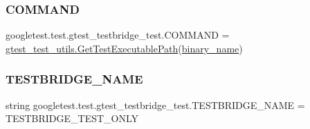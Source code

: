 \subsubsection{\texorpdfstring{COMMAND}{COMMAND}}
{\footnotesize\ttfamily googletest.\+test.\+gtest\+\_\+testbridge\+\_\+test.\+C\+O\+M\+M\+A\+ND = \mbox{\hyperlink{namespacegoogletest_1_1test_1_1gtest__test__utils_ac9af888c702350aac56b154a6af34098}{gtest\+\_\+test\+\_\+utils.\+Get\+Test\+Executable\+Path}}(\mbox{\hyperlink{namespacegoogletest_1_1test_1_1gtest__testbridge__test_a59ccdbf94eb879ba6516ba5b6c72719d}{binary\+\_\+name}})}

\mbox{\label{namespacegoogletest_1_1test_1_1gtest__testbridge__test_a891a204293b2ba9434a8486ac154754d}} 
\subsubsection{\texorpdfstring{TESTBRIDGE\_NAME}{TESTBRIDGE\_NAME}}
{\footnotesize\ttfamily string googletest.\+test.\+gtest\+\_\+testbridge\+\_\+test.\+T\+E\+S\+T\+B\+R\+I\+D\+G\+E\+\_\+\+N\+A\+ME = \textquotesingle{}T\+E\+S\+T\+B\+R\+I\+D\+G\+E\+\_\+\+T\+E\+S\+T\+\_\+\+O\+N\+LY\textquotesingle{}}

